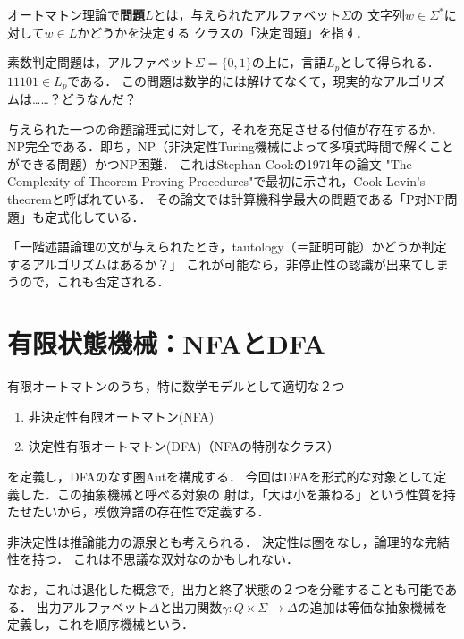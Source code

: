 \documentclass[uplatex, dvipdfmx]{jsreport}
\begin{document}
\begin{definition}[problem]
    オートマトン理論で\textbf{問題}$L$とは，与えられたアルファベット$\Sigma$の
    文字列$w\in\Sigma^*$に対して$w\in L$かどうかを決定する
    クラスの「決定問題」を指す．
\end{definition}

\begin{example}[素数判定問題]\label{problem-素数判定問題}
    素数判定問題は，アルファベット$\Sigma=\{0,1\}$の上に，言語$L_p$として得られる．$11101\in L_p$である．
    この問題は数学的には解けてなくて，現実的なアルゴリズムは……？どうなんだ？
\end{example}

\begin{example}\label{problem-SAT}
    与えられた一つの命題論理式に対して，それを充足させる付値が存在するか．
    NP完全である．即ち，NP（非決定性Turing機械によって多項式時間で解くことができる問題）かつNP困難．
    これはStephan Cookの1971年の論文 "The Complexity of Theorem Proving Procedures"で最初に示され，Cook-Levin's theoremと呼ばれている．
    その論文では計算機科学最大の問題である「P対NP問題」も定式化している．
\end{example}

\begin{example}\label{problem-Entscheidungsproblem}
    「一階述語論理の文が与えられたとき，tautology（＝証明可能）かどうか判定するアルゴリズムはあるか？」
    これが可能なら，非停止性の認識が出来てしまうので，これも否定される．
\end{example}

\section{有限状態機械：NFAとDFA}

\begin{tcolorbox}[colframe=ForestGreen, colback=ForestGreen!10!white, breakable,
    title=NFAとDFA]
    有限オートマトンのうち，特に数学モデルとして適切な２つ
    \begin{enumerate}
        \item 非決定性有限オートマトン(NFA)
        \item 決定性有限オートマトン(DFA)（NFAの特別なクラス）
    \end{enumerate}
    を定義し，DFAのなす圏Autを構成する．
    今回はDFAを形式的な対象として定義した．この抽象機械と呼べる対象の
    射は，「大は小を兼ねる」という性質を持たせたいから，模倣算譜の存在性で定義する．

    非決定性は推論能力の源泉とも考えられる．
    決定性は圏をなし，論理的な完結性を持つ．
    これは不思議な双対なのかもしれない．

    なお，これは退化した概念で，出力と終了状態の２つを分離することも可能である．
    出力アルファベット$\Delta$と出力関数$\gamma:Q\times\Sigma\to\Delta$の追加は等価な抽象機械を定義し，これを順序機械という．
\end{tcolorbox}
\end{document}
